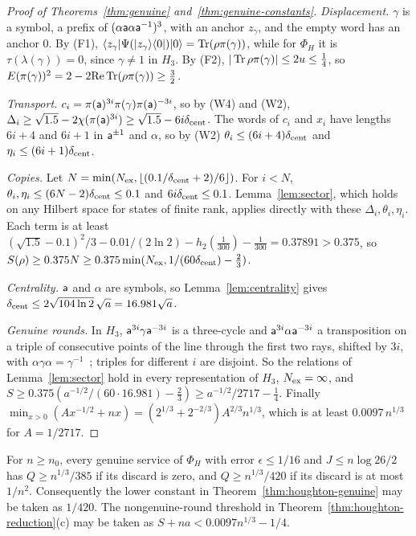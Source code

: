 \begin{proof}[Proof of Theorems~\ref{thm:genuine} and~\ref{thm:genuine-constants}]
\emph{Displacement.} $\gamma$ is a symbol, a prefix of $(\alpha\mathsf a\alpha\mathsf a^{-1})^3$, with an anchor $z_\gamma$, and the empty word has an anchor $0$. By (F1),
$\langle z_\gamma\rvert\Psi(\lvert z_\gamma\rangle\langle 0\rvert)\lvert 0\rangle=\operatorname{Tr}(\rho\pi(\gamma))$, while for $\Phi_H$ it is $\tau(\lambda(\gamma))=0$, since $\gamma\ne1$ in $H_3$. By (F2), $|\operatorname{Tr}\rho\pi(\gamma)|\le2u\le\frac14$, so
$E(\pi(\gamma))^2=2-2\mathrm{Re}\operatorname{Tr}(\rho\pi(\gamma))\ge\frac32$.

\emph{Transport.} $c_i=\pi(\mathsf a)^{3i}\pi(\gamma)\pi(\mathsf a)^{-3i}$, so by (W4) and (W2), $\Delta_i\ge\sqrt{1.5}-2\chi(\pi(\mathsf a)^{3i})\ge\sqrt{1.5}-6i\delta_{\rm cent}$. The words of $c_i$ and $x_i$ have lengths
$6i+4$ and $6i+1$ in $\mathsf a^{\pm1}$ and $\alpha$, so by (W2) $\theta_i\le(6i+4)\delta_{\rm cent}$ and $\eta_i\le(6i+1)\delta_{\rm cent}$.

\emph{Copies.} Let $N=\min(N_{\rm ex},\lfloor(0.1/\delta_{\rm cent}+2)/6\rfloor)$. For $i<N$, $\theta_i,\eta_i\le(6N-2)\delta_{\rm cent}\le0.1$ and $6i\delta_{\rm cent}\le0.1$. Lemma~\ref{lem:sector},
which holds on any Hilbert space for states of finite rank, applies directly with these $\Delta_i,\theta_i,\eta_i$. Each term is at least $(\sqrt{1.5}-0.1)^2/3-0.01/(2\ln2)-h_2(\frac1{300})-\frac1{300}=0.37891>0.375$, so
$S(\rho)\ge0.375N\ge0.375\min(N_{\rm ex},1/(60\delta_{\rm cent})-\frac23)$.

\emph{Centrality.} $\mathsf a$ and $\alpha$ are symbols, so Lemma~\ref{lem:centrality} gives $\delta_{\rm cent}\le2\sqrt{104\ln2}\,\sqrt a=16.981\sqrt a$.

\emph{Genuine rounds.} In $H_3$, $\mathsf a^{3i}\gamma\mathsf a^{-3i}$ is a three-cycle and $\mathsf a^{3i}\alpha\mathsf a^{-3i}$ a transposition on a triple of consecutive points of the line through the
first two rays, shifted by $3i$, with $\alpha\gamma\alpha=\gamma^{-1}$~\cite[Section~4]{DouglasMghirbiB}; triples for different $i$ are disjoint. So the relations of
Lemma~\ref{lem:sector} hold in every representation of $H_3$, $N_{\rm ex}=\infty$, and $S\ge0.375(a^{-1/2}/(60\cdot16.981)-\frac23)\ge a^{-1/2}/2717-\frac14$. Finally
$\min_{x>0}(Ax^{-1/2}+nx)=(2^{1/3}+2^{-2/3})A^{2/3}n^{1/3}$, which is at least $0.0097\,n^{1/3}$ for $A=1/2717$.
\end{proof}

\begin{theorem}\label{thm:genuine-services-constants}
For $n\ge n_0$, every genuine service of $\Phi_H$ with error
$\epsilon\le1/16$ and $J\le n\log26/2$ has $Q\ge n^{1/3}/385$
if its discard is zero, and $Q\ge n^{1/3}/420$ if its discard is
at most $1/n^2$. Consequently the lower constant in
Theorem~\ref{thm:houghton-genuine} may be taken as $1/420$.
The nongenuine-round threshold in Theorem~\ref{thm:houghton-reduction}(c)
may be taken as $S+na<0.0097n^{1/3}-1/4$.
\end{theorem}


